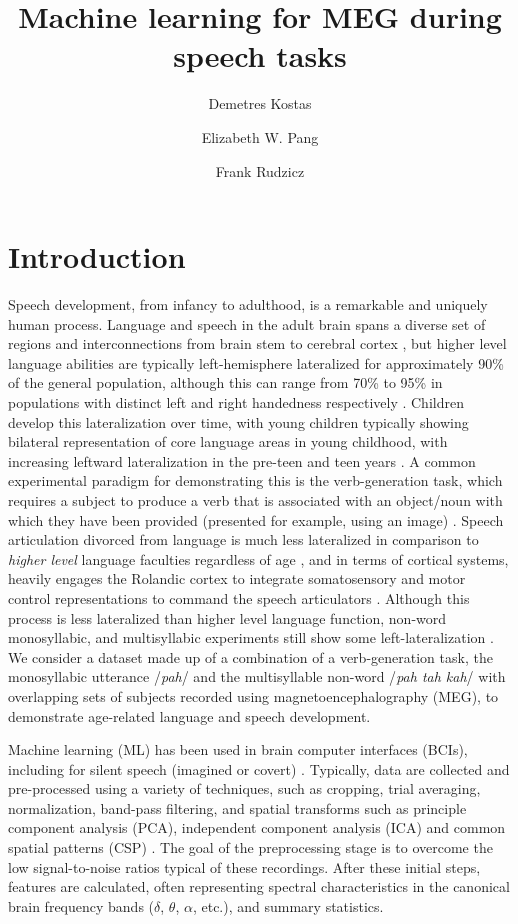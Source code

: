 \documentclass[fleqn,10pt]{wlscirep}
\title{Machine learning for MEG during speech tasks}
\author[1,2,*]{Demetres Kostas}
\author[1,3,4]{Elizabeth W. Pang}
\author[1,2,5]{Frank Rudzicz}
\affil[1]{University of Toronto; Toronto, Canada}
\affil[2]{Vector Institute; Toronto, Canada}
\affil[3]{Hospital for Sick Children; Toronto, Canada}
\affil[4]{SickKids Research Institute; Toronto, Canada}
\affil[5]{Toronto Rehabilitation Institute-UHN; Toronto, Canada}
\affil[*]{demetres@cs.toronto.edu}
\begin{document}
\flushbottom
\maketitle

\thispagestyle{empty}

\section*{Introduction}

Speech development, from infancy to adulthood, is a remarkable and uniquely human process. Language and speech in the adult brain spans a diverse set of regions and interconnections from brain stem to cerebral cortex \cite{GuentherBook, Tourville2011, Hillis}, but higher level language abilities are typically left-hemisphere lateralized for approximately 90\% of the general population, although this  can range from 70\% to 95\% in populations with distinct left and right handedness respectively \cite{GuentherBook, Kadis2011, Yu2014}. Children develop this lateralization over time, with young children typically showing bilateral representation of core language areas in young childhood, with increasing leftward lateralization in the pre-teen and teen years \cite{Kadis2011, Ressel2008}. A common experimental paradigm for demonstrating this is the verb-generation task, which requires a subject to produce a verb that is associated with an object/noun with which they have been provided (presented for example, using an image) \cite{Kadis2011}. Speech articulation divorced from language is much less lateralized in comparison to {\em higher level} language faculties regardless of age \cite{GuentherBook}, and in terms of cortical systems, heavily engages the Rolandic cortex to integrate somatosensory and motor control representations to command the speech articulators \cite{GuentherBook}. Although this process is less lateralized than higher level language function, non-word monosyllabic, and multisyllabic experiments still show some left-lateralization \cite{Ghosh2008a}. We consider a dataset made up of a combination of a verb-generation task, the monosyllabic utterance /{\em pah}/ and the multisyllable non-word /{\em pah tah kah}/ with overlapping sets of subjects recorded using magnetoencephalography (MEG), to demonstrate age-related language and speech development.

Machine learning (ML) has been used in brain computer interfaces (BCIs), including for silent speech (imagined or covert) \cite{Sereshkeh2017, Guimaraes2007, Zhao2015a}. Typically, data are collected and pre-processed using a variety of techniques, such as cropping, trial averaging, normalization, band-pass filtering, and spatial transforms such as principle component analysis (PCA), independent component analysis (ICA) and common spatial patterns (CSP) \cite{RezaeiTabar2016,Muller-Gerking1999}. The goal of the preprocessing stage is to overcome the low signal-to-noise ratios typical of these recordings. After these initial steps, features are calculated, often representing spectral characteristics in the canonical brain frequency bands ($\delta$, $\theta$, $\alpha$, etc.), and summary statistics. 
\end{document}
